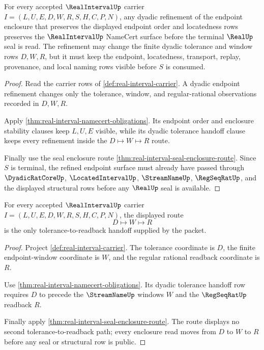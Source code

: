 \begin{theorem}
\label{thm:real-interval-endpoint-refinement-stability}
For every accepted $\RealIntervalUp$ carrier $I=(L,U,E,D,W,R,S,H,C,P,N)$, any dyadic refinement of the endpoint enclosure that preserves the displayed endpoint order and locatedness rows preserves the $\RealIntervalUp$ NameCert surface before the terminal $\RealUp$ seal is read. The refinement may change the finite dyadic tolerance and window rows $D,W,R$, but it must keep the endpoint, locatedness, transport, replay, provenance, and local naming rows visible before $S$ is consumed.
\end{theorem}
\begin{proof}
Read the carrier rows of \autoref{def:real-interval-carrier}. A dyadic endpoint refinement changes only the tolerance, window, and regular-rational observations recorded in $D,W,R$.

Apply \autoref{thm:real-interval-namecert-obligations}. Its endpoint order and enclosure stability clauses keep $L,U,E$ visible, while its dyadic tolerance handoff clause keeps every refinement inside the $D\mapsto W\mapsto R$ route.

Finally use the seal enclosure route \autoref{thm:real-interval-seal-enclosure-route}. Since $S$ is terminal, the refined endpoint surface must already have passed through $\DyadicRatCoreUp$, $\LocatedIntervalUp$, $\StreamNameUp$, $\RegSeqRatUp$, and the displayed structural rows before any $\RealUp$ seal is available.
\end{proof}

\begin{theorem}
\label{thm:real-interval-dyadic-window-handoff}
For every accepted $\RealIntervalUp$ carrier $I=(L,U,E,D,W,R,S,H,C,P,N)$, the displayed route
$$
D \longmapsto W \longmapsto R
$$
is the only tolerance-to-readback handoff supplied by the packet.
\end{theorem}
\begin{proof}
Project \autoref{def:real-interval-carrier}. The tolerance coordinate is $D$, the finite endpoint-window coordinate is $W$, and the regular rational readback coordinate is $R$.

Use \autoref{thm:real-interval-namecert-obligations}. Its dyadic tolerance handoff row requires $D$ to precede the $\StreamNameUp$ windows $W$ and the $\RegSeqRatUp$ readback $R$.

Finally apply \autoref{thm:real-interval-seal-enclosure-route}. The route displays no second tolerance-to-readback path; every enclosure read moves from $D$ to $W$ to $R$ before any seal or structural row is public.
\end{proof}

